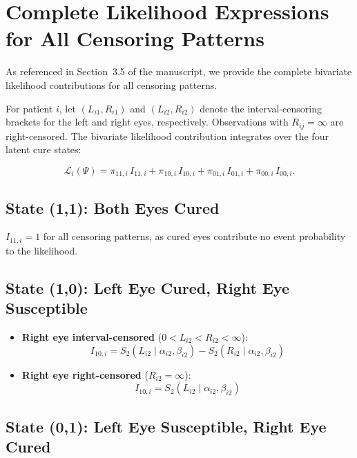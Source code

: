 \documentclass[12pt,a4paper]{article}
\begin{document}
\section{Complete Likelihood Expressions for All Censoring Patterns}

As referenced in Section~3.5 of the manuscript, we provide the complete bivariate likelihood contributions for all censoring patterns.

For patient $i$, let $(L_{i1}, R_{i1})$ and $(L_{i2}, R_{i2})$ denote the interval-censoring brackets for the left and right eyes, respectively. Observations with $R_{ij} = \infty$ are right-censored. The bivariate likelihood contribution integrates over the four latent cure states:

\begin{equation}
\mathcal{L}_i(\Psi) = \pi_{11,i} \, I_{11,i} + \pi_{10,i} \, I_{10,i} 
+ \pi_{01,i} \, I_{01,i} + \pi_{00,i} \, I_{00,i}.
\end{equation}

\subsection{State (1,1): Both Eyes Cured}

$I_{11,i} = 1$ for all censoring patterns, as cured eyes contribute no event probability to the likelihood.

\subsection{State (1,0): Left Eye Cured, Right Eye Susceptible}

\begin{itemize}
\item \textbf{Right eye interval-censored} ($0 < L_{i2} < R_{i2} < \infty$):
  \begin{equation}
  I_{10,i} = S_2(L_{i2} \mid \alpha_{i2}, \beta_{i2}) - S_2(R_{i2} \mid \alpha_{i2}, \beta_{i2})
  \end{equation}
\item \textbf{Right eye right-censored} ($R_{i2} = \infty$):
  \begin{equation}
  I_{10,i} = S_2(L_{i2} \mid \alpha_{i2}, \beta_{i2})
  \end{equation}
\end{itemize}

\subsection{State (0,1): Left Eye Susceptible, Right Eye Cured}
\end{document}
